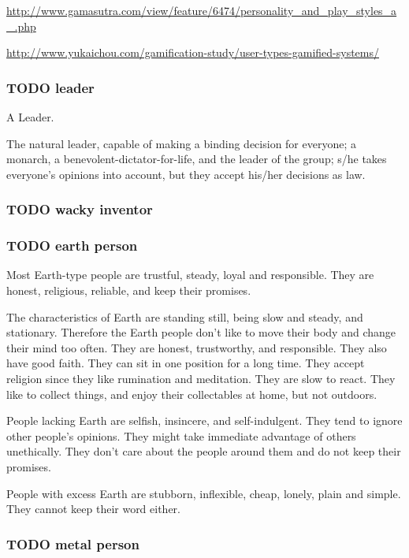 \documentclass[11pt]{article}
\begin{document}
\url{http://www.gamasutra.com/view/feature/6474/personality_and_play_styles_a_.php}

\url{http://www.yukaichou.com/gamification-study/user-types-gamified-systems/}

\subsubsection{{\bfseries\sffamily TODO} leader}
\label{sec-2-2-1}

A Leader.

The natural leader, capable of making a binding decision for
everyone; a monarch, a benevolent-dictator-for-life, and the leader of
the group; s/he takes everyone's opinions into account, but they
accept his/her decisions as law.
\subsubsection{{\bfseries\sffamily TODO} wacky inventor}
\label{sec-2-2-2}

\subsubsection{{\bfseries\sffamily TODO} earth person}
\label{sec-2-2-3}



Most Earth-type people are trustful, steady, loyal and
responsible. They are honest, religious, reliable, and keep
their promises.

The characteristics of Earth are standing still, being slow and
steady, and stationary. Therefore the Earth people don't like to move
their body and change their mind too often. They are honest,
trustworthy, and responsible. They also have good faith. They can sit
in one position for a long time. They accept religion since they like
rumination and meditation. They are slow to react. They like to
collect things, and enjoy their collectables at home, but
not outdoors.

People lacking Earth are selfish, insincere, and self-indulgent. They
tend to ignore other people's opinions. They might take immediate
advantage of others unethically. They don't care about the people
around them and do not keep their promises.

People with excess Earth are stubborn, inflexible, cheap, lonely,
plain and simple. They cannot keep their word either. 
\subsubsection{{\bfseries\sffamily TODO} metal person}
\label{sec-2-2-4}
\end{document}
